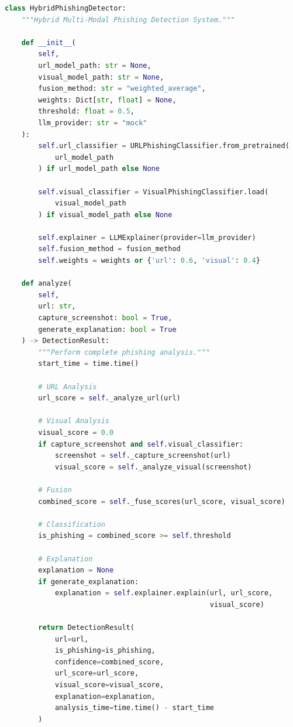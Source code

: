 \documentclass[12pt,a4paper]{report}
\begin{document}
\begin{lstlisting}[language=Python, caption=Hybrid Detector Main Class]
class HybridPhishingDetector:
    """Hybrid Multi-Modal Phishing Detection System."""
    
    def __init__(
        self,
        url_model_path: str = None,
        visual_model_path: str = None,
        fusion_method: str = "weighted_average",
        weights: Dict[str, float] = None,
        threshold: float = 0.5,
        llm_provider: str = "mock"
    ):
        self.url_classifier = URLPhishingClassifier.from_pretrained(
            url_model_path
        ) if url_model_path else None
        
        self.visual_classifier = VisualPhishingClassifier.load(
            visual_model_path
        ) if visual_model_path else None
        
        self.explainer = LLMExplainer(provider=llm_provider)
        self.fusion_method = fusion_method
        self.weights = weights or {'url': 0.6, 'visual': 0.4}
    
    def analyze(
        self,
        url: str,
        capture_screenshot: bool = True,
        generate_explanation: bool = True
    ) -> DetectionResult:
        """Perform complete phishing analysis."""
        start_time = time.time()
        
        # URL Analysis
        url_score = self._analyze_url(url)
        
        # Visual Analysis
        visual_score = 0.0
        if capture_screenshot and self.visual_classifier:
            screenshot = self._capture_screenshot(url)
            visual_score = self._analyze_visual(screenshot)
        
        # Fusion
        combined_score = self._fuse_scores(url_score, visual_score)
        
        # Classification
        is_phishing = combined_score >= self.threshold
        
        # Explanation
        explanation = None
        if generate_explanation:
            explanation = self.explainer.explain(url, url_score, 
                                                 visual_score)
        
        return DetectionResult(
            url=url,
            is_phishing=is_phishing,
            confidence=combined_score,
            url_score=url_score,
            visual_score=visual_score,
            explanation=explanation,
            analysis_time=time.time() - start_time
        )
\end{lstlisting}
\end{document}
